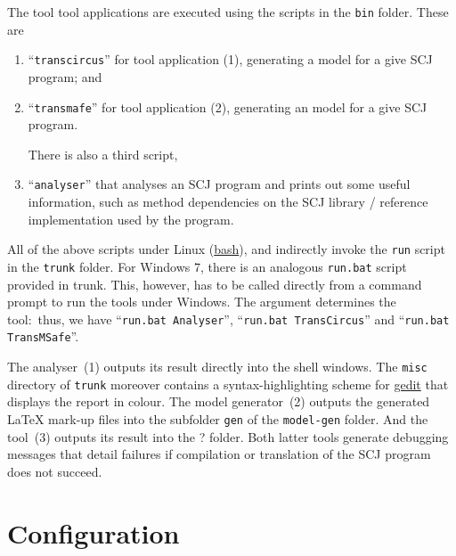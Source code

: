 \documentclass{report}
\begin{document}
The tool {\hiJAC} tool applications are executed using the scripts in the \verb"bin" folder. These are
%
\begin{enumerate}
  \item ``\verb"transcircus"'' for tool application (1), generating a {\Circus} model for a give SCJ program; and

  \item ``\verb"transmafe"'' for tool application (2), generating an {\mSafe} model for a give SCJ program.

  There is also a third script,

  \item ``\verb"analyser"'' that analyses an SCJ program and prints out some useful information, such as method dependencies on the SCJ library / reference implementation used by the program.
\end{enumerate}
%
All of the above scripts under Linux (\href{http://www.gnu.org/software/bash/}{bash}), and indirectly invoke the \verb"run" script in the \verb"trunk" folder. For Windows 7, there is an analogous \verb"run.bat" script provided in trunk. This, however, has to be called directly from a command prompt to run the tools under Windows. The argument determines the tool:~thus, we have ``\verb"run.bat Analyser"'', ``\verb"run.bat TransCircus"'' and ``\verb"run.bat TransMSafe"''.


The analyser~(1) outputs its result directly into the shell windows. The \verb"misc" directory of \verb"trunk" moreover contains a syntax-highlighting scheme for \href{https://wiki.gnome.org/Apps/Gedit}{gedit} that displays the report in colour. The {\Circus} model generator~(2) outputs the generated {\LaTeX} mark-up files into the subfolder \verb"gen" of the \verb"model-gen" folder. And the {\mSafe} tool~(3) outputs its result into the ? folder. Both latter tools generate debugging messages that detail failures if compilation or translation of the SCJ program does not succeed.



\chapter{Configuration}
\label{chap:Configuration}
\end{document}
